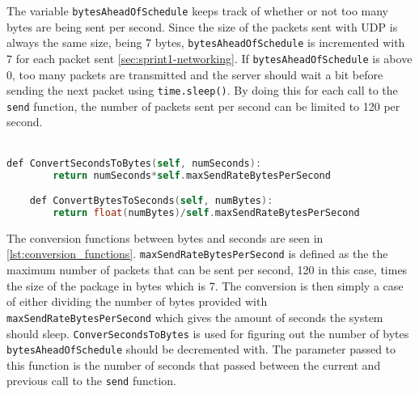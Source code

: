 The variable \texttt{bytesAheadOfSchedule} keeps track of whether or not too many bytes are being sent per second.
Since the size of the packets sent with UDP is always the same size, being 7 bytes, \texttt{bytesAheadOfSchedule} is incremented with 7 for each packet sent \autoref{sec:sprint1-networking}.
If \texttt{bytesAheadOfSchedule} is above 0, too many packets are transmitted and the server should wait a bit before sending the next packet using \texttt{time.sleep()}.
By doing this for each call to the \texttt{send} function, the number of packets sent per second can be limited to 120 per second.
\\\\
\begin{lstlisting}[caption={function for converting seconds to bytes and bytes to seconds}, captionpos=b,language=C,label={lst:conversion_functions}]
    def ConvertSecondsToBytes(self, numSeconds):
        return numSeconds*self.maxSendRateBytesPerSecond

    def ConvertBytesToSeconds(self, numBytes):
        return float(numBytes)/self.maxSendRateBytesPerSecond
\end{lstlisting}
\noindent
The conversion functions between bytes and seconds are seen in \autoref{lst:conversion_functions}.
\texttt{maxSendRateBytesPerSecond} is defined as the the maximum number of packets that can be sent per second, 120 in this case, times the size of the package in bytes which is 7.
The conversion is then simply a case of either dividing the number of bytes provided with \texttt{maxSendRateBytesPerSecond} which gives the amount of seconds the system should sleep.
\texttt{ConverSecondsToBytes} is used for figuring out the number of bytes \texttt{bytesAheadOfSchedule} should be decremented with.
The parameter passed to this function is the number of seconds that passed between the current and previous call to the \texttt{send} function.
